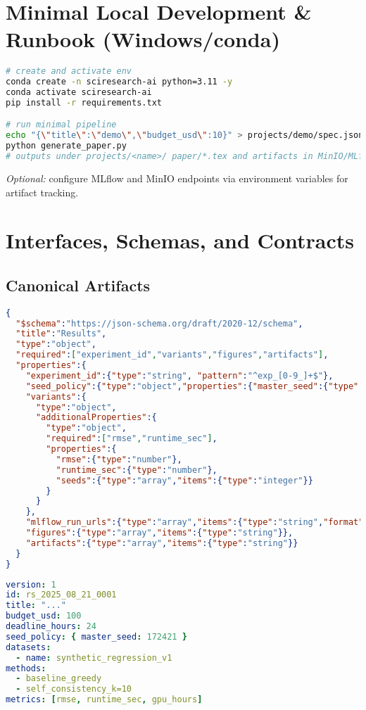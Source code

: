 \section{Minimal Local Development \& Runbook (Windows/conda)}
\begin{lstlisting}[style=code,language=bash,caption={Local smoke run (CPU)}]
# create and activate env
conda create -n sciresearch-ai python=3.11 -y
conda activate sciresearch-ai
pip install -r requirements.txt

# run minimal pipeline
echo "{\"title\":\"demo\",\"budget_usd\":10}" > projects/demo/spec.json
python generate_paper.py
# outputs under projects/<name>/ paper/*.tex and artifacts in MinIO/MLflow (if configured)
\end{lstlisting}
\noindent\textit{Optional:} configure MLflow and MinIO endpoints via environment variables for artifact tracking.

\section{Interfaces, Schemas, and Contracts}
\subsection{Canonical Artifacts}
\begin{lstlisting}[style=code,language=json,caption={results.json JSON Schema (excerpt)}]
{
  "$schema":"https://json-schema.org/draft/2020-12/schema",
  "title":"Results",
  "type":"object",
  "required":["experiment_id","variants","figures","artifacts"],
  "properties":{
    "experiment_id":{"type":"string", "pattern":"^exp_[0-9_]+$"},
    "seed_policy":{"type":"object","properties":{"master_seed":{"type":"integer"}}},
    "variants":{
      "type":"object",
      "additionalProperties":{
        "type":"object",
        "required":["rmse","runtime_sec"],
        "properties":{
          "rmse":{"type":"number"},
          "runtime_sec":{"type":"number"},
          "seeds":{"type":"array","items":{"type":"integer"}}
        }
      }
    },
    "mlflow_run_urls":{"type":"array","items":{"type":"string","format":"uri"}},
    "figures":{"type":"array","items":{"type":"string"}},
    "artifacts":{"type":"array","items":{"type":"string"}}
  }
}
\end{lstlisting}

\begin{lstlisting}[style=code,language=yaml,caption={research_spec.yaml (normalized fields)}]
version: 1
id: rs_2025_08_21_0001
title: "..."
budget_usd: 100
deadline_hours: 24
seed_policy: { master_seed: 172421 }
datasets:
  - name: synthetic_regression_v1
methods:
  - baseline_greedy
  - self_consistency_k=10
metrics: [rmse, runtime_sec, gpu_hours]
\end{lstlisting}

